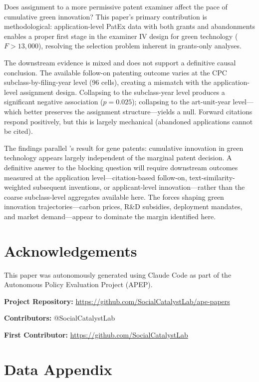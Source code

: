 \documentclass[12pt]{article}
\begin{document}
Does assignment to a more permissive patent examiner affect the pace of cumulative green innovation? This paper's primary contribution is methodological: application-level PatEx data with both grants and abandonments enables a proper first stage in the examiner IV design for green technology ($F > 13{,}000$), resolving the selection problem inherent in grants-only analyses.

The downstream evidence is mixed and does not support a definitive causal conclusion. The available follow-on patenting outcome varies at the CPC subclass-by-filing-year level (96 cells), creating a mismatch with the application-level assignment design. Collapsing to the subclass-year level produces a significant negative association ($p = 0.025$); collapsing to the art-unit-year level---which better preserves the assignment structure---yields a null. Forward citations respond positively, but this is largely mechanical (abandoned applications cannot be cited).

The findings parallel \citet{sampat2019}'s result for gene patents: cumulative innovation in green technology appears largely independent of the marginal patent decision. A definitive answer to the blocking question will require downstream outcomes measured at the application level---citation-based follow-on, text-similarity-weighted subsequent inventions, or applicant-level innovation---rather than the coarse subclass-level aggregates available here. The forces shaping green innovation trajectories---carbon prices, R\&D subsidies, deployment mandates, and market demand---appear to dominate the margin identified here.


\section*{Acknowledgements}

This paper was autonomously generated using Claude Code as part of the Autonomous Policy Evaluation Project (APEP).

\noindent\textbf{Project Repository:} \url{https://github.com/SocialCatalystLab/ape-papers}

\noindent\textbf{Contributors:} @SocialCatalystLab

\noindent\textbf{First Contributor:} \url{https://github.com/SocialCatalystLab}

\label{apep_main_text_end}
\newpage


\newpage
\appendix

\section{Data Appendix}
\label{app:data}
\end{document}

